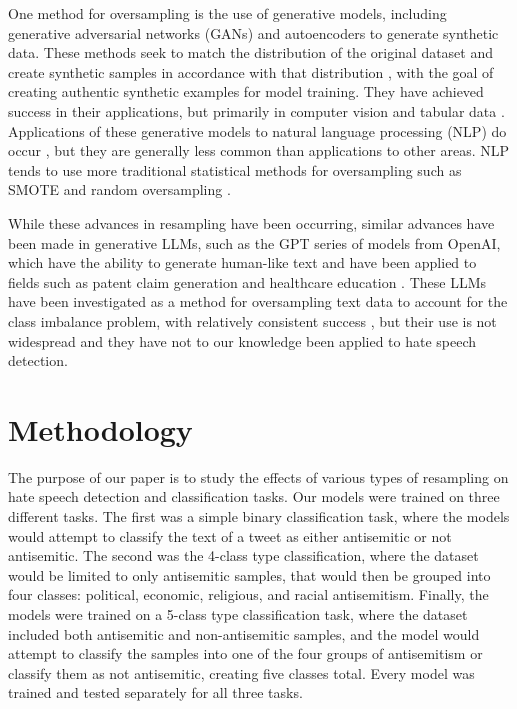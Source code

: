 \documentclass[runningheads]{llncs}
\begin{document}
One method for oversampling is the use of generative models, including generative adversarial networks (GANs) and autoencoders to generate synthetic data. These methods seek to match the distribution of the original dataset and create synthetic samples in accordance with that distribution \cite{hao}, with the goal of creating authentic synthetic examples for model training. They have achieved success in their applications, but primarily in computer vision and tabular data \cite{hao} \cite{engelmann} \cite{bellinger} \cite{dai}. Applications of these generative models to natural language processing (NLP) do occur \cite{phung}, but they are generally less common than applications to other areas. NLP tends to use more traditional statistical methods for oversampling such as SMOTE and random oversampling \cite{wijaya} \cite{glazkova}.

While these advances in resampling have been occurring, similar advances have been made in generative LLMs, such as the GPT series of models from OpenAI, which have the ability to generate human-like text \cite{floridi} and have been applied to fields such as patent claim generation \cite{hsiang} and healthcare education \cite{sallam}. These LLMs have been investigated as a method for oversampling text data to account for the class imbalance problem, with relatively consistent success \cite{edwards} \cite{usuga} \cite{shaikh}, but their use is not widespread and they have not to our knowledge been applied to hate speech detection.

\section{Methodology}
The purpose of our paper is to study the effects of various types of resampling on hate speech detection and classification tasks. Our models were trained on three different tasks. The first was a simple binary classification task, where the models would attempt to classify the text of a tweet as either antisemitic or not antisemitic. The second was the 4-class type classification, where the dataset would be limited to only antisemitic samples, that would then be grouped into four classes: political, economic, religious, and racial antisemitism. Finally, the models were trained on a 5-class type classification task, where the dataset included both antisemitic and non-antisemitic samples, and the model would attempt to classify the samples into one of the four groups of antisemitism or classify them as not antisemitic, creating five classes total. Every model was trained and tested separately for all three tasks.
\end{document}
